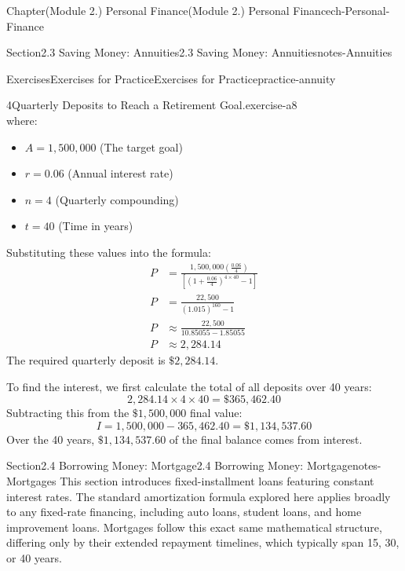 \documentclass[oneside,10pt,]{book}
\newcommand{\ptxlistdisc}{\raisebox{0.3ex}{\textbullet}}
\newcommand{\amp}{&}
\begin{document}
\begin{chapterptx}{Chapter}{(Module 2.) Personal Finance}{}{(Module 2.) Personal Finance}{}{}{ch-Personal-Finance}
\begin{sectionptx}{Section}{2.3 Saving Money: Annuities}{}{2.3 Saving Money: Annuities}{}{}{notes-Annuities}
\begin{exercises-subsection-numberless}{Exercises}{Exercises for Practice}{}{Exercises for Practice}{}{}{practice-annuity}
\begin{divisionexercise}{4}{Quarterly Deposits to Reach a Retirement Goal.}{}{exercise-a8}
\begin{equation*}
\end{equation*}
where:%
\begin{itemize}[label=\ptxlistdisc]
\item{}\(A = 1,500,000\) (The target goal)%
\item{}\(r = 0.06\) (Annual interest rate)%
\item{}\(n = 4\) (Quarterly compounding)%
\item{}\(t = 40\) (Time in years)%
\end{itemize}
%
\par
Substituting these values into the formula:%
\begin{align*}
P \amp = \frac{1,500,000 \left( \frac{0.06}{4} \right)}{\left[ \left( 1 + \frac{0.06}{4} \right)^{4 \times 40} - 1 \right]}\\
P \amp = \frac{22,500}{(1.015)^{160} - 1}\\
P \amp \approx \frac{22,500}{10.85055 - 1.85055}\\
P \amp \approx 2,284.14
\end{align*}
The required quarterly deposit is \(\$2,284.14\).%
\par
To find the interest, we first calculate the total of all deposits over 40 years:%
\begin{equation*}
2,284.14 \times 4 \times 40 = \$365,462.40
\end{equation*}
Subtracting this from the \(\$1,500,000\) final value:%
\begin{equation*}
I = 1,500,000 - 365,462.40 = \$1,134,537.60
\end{equation*}
Over the 40 years, \(\$1,134,537.60\) of the final balance comes from interest.%
\end{divisionexercise}%
\end{exercises-subsection-numberless}
\end{sectionptx}
%
%
\typeout{************************************************}
\typeout{************************************************}
%
\begin{sectionptx}{Section}{2.4 Borrowing Money: Mortgage}{}{2.4 Borrowing Money: Mortgage}{}{}{notes-Mortgages}
This section introduces fixed-installment loans featuring constant interest rates. The standard amortization formula explored here applies broadly to any fixed-rate financing, including auto loans, student loans, and home improvement loans. Mortgages follow this exact same mathematical structure, differing only by their extended repayment timelines, which typically span 15, 30, or 40 years.%

\end{sectionptx}
\end{chapterptx}
\end{document}
